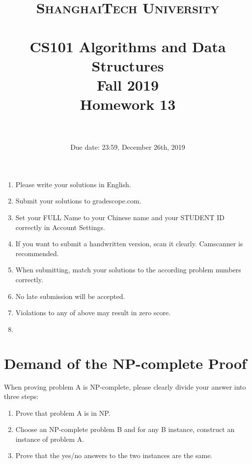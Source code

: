 \documentclass{article}
\title{
    \normalfont \normalsize
    \textsc{ShanghaiTech University} \\ [25pt]
    \horrule{0.5pt} \\[0.4cm] %
    \huge CS101 Algorithms and Data Structures\\ %
    \LARGE Fall 2019\\
    \LARGE Homework 13\\
    \horrule{2pt} \\[0.5cm] %
}
\author{}
\date{Due date: 23:59, December 26th, 2019}
\begin{document}
\maketitle
\thispagestyle{firstpage}
\vspace{3ex}

\begin{enumerate}
\item Please write your solutions in English. 

\item Submit your solutions to gradescope.com.  

\item Set your FULL Name to your Chinese name and your STUDENT ID correctly in Account Settings. 

\item If you want to submit a handwritten version, scan it clearly. Camscanner is recommended. 

\item When submitting, match your solutions to the according problem numbers correctly. 

\item No late submission will be accepted.

\item Violations to any of above may result in zero score. 

\item {\large\color{red}{In this homework, all the proofs need three steps. The demand is on the next page. If you do not answer in a standard format, you will not get any point.}}

\end{enumerate}
\newpage
\section*{Demand of the NP-complete Proof}
When proving problem A is NP-complete, please clearly divide your answer into three steps:
\begin{enumerate}

\item Prove that problem A is in NP.

\item Choose an NP-complete problem B and for any B instance, construct an instance of problem A.

\item Prove that the yes/no answers to the two instances are the same.

\end{enumerate}
\newpage
\end{document}
